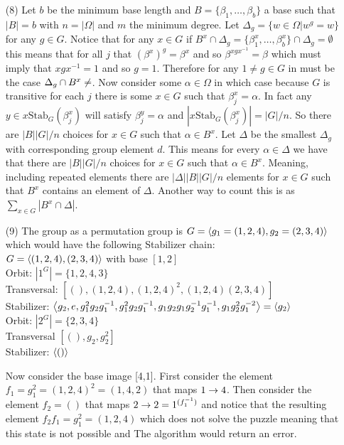 \documentclass[12pt]{amsart}
\begin{document}
\begin{itemize}
\begin{enumerate}[label= (\alph*)]
   \end{enumerate}
   \item[(8)] Let $b$ be the minimum base length and $B=\{\beta_1,\dots,\beta_b\}$ a base such 
   that $|B|=b$ with $n=|\Omega|$ and $m$ the minimum degree. Let $\Delta_g=\{w\in\Omega| w^g=w\}$ for any 
   $g\in G$. Notice that for any $x\in G$ if $B^x\cap \Delta_g=\{\beta_1^x,\dots,\beta_b^x\}\cap\Delta_g=\emptyset$
   this means that for all $j$ that $(\beta^x)^g=\beta^x$ and so $\beta^{xgx^{-1}}=\beta$ which must
   imply that $xgx^{-1}=1$ and so $g=1$. Therefore for any $1\neq g\in G$ in must be the case 
   $\Delta_g\cap B^x\neq \empty$. Now consider some $\alpha\in \Omega$ in which case because $G$
   is transitive for each $j$ there is some $x\in G$ such that $\beta_j^x=\alpha$. In fact any 
   $y\in x\text{Stab}_G(\beta_j^x)$ will satisfy $\beta_j^y=\alpha$ and $|x\text{Stab}_G(\beta_j^x)|=|G|/n$.
   So there are $|B||G|/n$ choices for $x\in G$ such that $\alpha\in B^x$. Let $\Delta$ be the smallest 
   $\Delta_g$ with corresponding group element $d$. This means for every $\alpha\in \Delta$ we have that
   there are $|B||G|/n$ choices for $x\in G$ such that $\alpha\in B^x$. Meaning, including repeated elements 
   there are $|\Delta||B||G|/n$ elements for $x\in G$ such that $B^x$ contains an element of $\Delta$. 
   Another way to count this is as $\sum_{x\in G}|B^x\cap \Delta|$.
   
   
   \item[(9)] The group as a permutation group is $G=\left\langle g_1=(1,2,4),g_2=(2,3,4) \right\rangle$ 
   which would have the following Stabilizer chain:\\
   $G=\left\langle (1,2,4),(2,3,4) \right\rangle$ with base $[1,2]$\\
   Orbit: $|1^G|=\{1,2,4,3\}$\\
   Transversal: $[(),(1,2,4), (1,2,4)^2, (1,2,4)(2,3,4)]$\\
   Stabilizer: $\left\langle g_2,e,g_1^2g_2g_1^{-1},g_1^2g_2g_1^{-1},g_1g_2g_1g_2^{-1}g_1^{-1},g_1g_2^2g_1^{-2} \right\rangle=\left\langle g_2 \right\rangle$\\
      \hspace*{.5in}Orbit: $|2^{G}|=\{2,3,4\}$\\
      \hspace*{.5in}Transversal $[(),g_2,g_2^2]$\\
      \hspace*{.5in}Stabilizer: $\left\langle () \right\rangle$  

      Now consider the base image [4,1]. First consider the element $f_1=g^2_1=(1,2,4)^2=(1,4,2)$ 
      that maps $1\rightarrow 4$.
      Then consider the element $f_2=()$ that maps $2\rightarrow 2=1^{(f_1^{-1})}$ and notice that the resulting element
      $f_2f_1=g_1^2=(1,2,4)$ which does not solve the puzzle meaning that this state is not possible and The
      algorithm would return an error.


\end{itemize}
\end{document}
